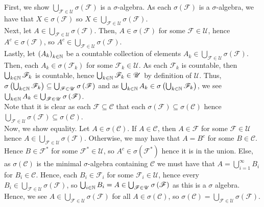 \documentclass[a4paper]{article}
\begin{document}
\begin{solution}
	First, we show \(\bigcup_{\mathscr{F}\in \mathscr{U}} \sigma \left( \mathscr{F} \right) \) is a \(\sigma\)-algebra. As each \(\sigma \left( \mathscr{F} \right) \) is a \(\sigma\)-algebra, we have that \(X \in \sigma\left( \mathscr{F} \right) \) so \(X \in \bigcup_{\mathscr{F}\in \mathscr{U}} \sigma \left( \mathscr{F} \right) \).\\
	Next, let \(A \in \bigcup_{\mathscr{F}\in \mathscr{U}} \sigma \left( \mathscr{F} \right) \). Then, \(A \in \sigma\left( \mathscr{F} \right) \) for some \(\mathscr{F} \in \mathscr{U}\), hence \(A^{c} \in \sigma ( \mathscr{F})\), so \(A^{c} \in \bigcup_{\mathscr{F}\in \mathscr{U}}  \sigma \left( \mathscr{F} \right) \).\\
	Lastly, let \(\left( A_{k} \right)_{k \in \mathbb{N}} \) be a countable collection of elements \(A_{k} \in \bigcup_{\mathscr{F} \in \mathscr{U}} \sigma \left( \mathscr{F} \right) \). Then, each \(A_{k} \in \sigma \left( \mathscr{F}_{k} \right) \) for some \(\mathscr{F}_{k} \in \mathscr{U}\). As each \(\mathscr{F}_{k}\) is countable, then \(\bigcup_{k \in \mathbb{N}} \mathscr{F}_{k}\) is countable, hence \(\bigcup_{ k\in \mathbb{N}} \mathscr{F}_{k} \in \mathscr{U} \) by definition of \(\mathscr{U}\). Thus, \(\sigma \left( \bigcup_{ k \in \mathbb{N}} \mathscr{F} _{k} \right) \subseteq \bigcup_{\mathscr{F}\in \mathscr{U}} \sigma\left( \mathscr{F} \right) \) and as \(\bigcup_{k \in \mathbb{N}}A_{k} \in \sigma \left( \bigcup_{k \in \mathbb{N}} \mathscr{F}_{k} \right)  \), we see \(\bigcup_{k \in \mathbb{N}}A_{k} \in \bigcup_{\mathscr{F} \in \mathscr{U}} \sigma \left( \mathscr{F} \right)  \).\\

	Note that it is clear as each \(\mathscr{F}\subseteq \mathscr{C}\) that each \(\sigma \left( \mathscr{F} \right) \subseteq \sigma \left( \mathscr{C} \right) \) hence \(\bigcup_{ \mathscr{F} \in \mathscr{U}} \sigma \left( \mathscr{F} \right) \subseteq \sigma \left( \mathscr{C} \right) \).\\
	Now, we show equality. Let \(A \in \sigma \left( \mathscr{C} \right) \). If \(A \in \mathscr{C}\), then \(A \in \mathscr{F}\) for some \(\mathscr{F} \in \mathscr{U}\) hence \(A \in \bigcup_{\mathscr{F}\in \mathscr{U}} \sigma \left( \mathscr{F} \right) \). Otherwise, we may have that \(A = B^{c}\) for some \(B \in \mathscr{C}\). Hence \(B \in \mathscr{F}^{*}\) for some \(\mathscr{F}^{*} \in \mathscr{U}\), so \(A^{c} \in \sigma \left( \mathscr{F}^{*} \right) \) hence it is in the union. Else, as \(\sigma \left( \mathscr{C} \right) \) is the minimal \(\sigma\)-algebra containing \(\mathscr{C}\) we must have that \(A = \bigcup_{i=1}^{\infty}B_{i} \) for \(B_{i} \in \mathscr{C}\). Hence, each \(B_{i} \in \mathscr{F}_{i}\) for some \(\mathscr{F}_{i} \in \mathscr{U}\), hence every \(B_{i} \in \bigcup_{\mathscr{F} \in \mathscr{U}}\sigma \left( \mathscr{F} \right)  \), so \(\bigcup_{i \in \mathbb{N}} B_{i}  = A \in \bigcup_{\mathscr{F}\in \mathscr{U}}\sigma \left( \mathscr{F} \right)  \) as this is a \(\sigma\) algebra. Hence, we see \(A \in \bigcup_{\mathscr{F} \in \mathscr{U}} \sigma \left( \mathscr{F} \right) \) for all \(A \in \sigma (\mathscr{C})\), so \(\sigma \left( \mathscr{C} \right)  = \bigcup_{\mathscr{F} \in \mathscr{U}}\sigma \left( \mathscr{F} \right)  \).
\end{solution}
\end{document}
